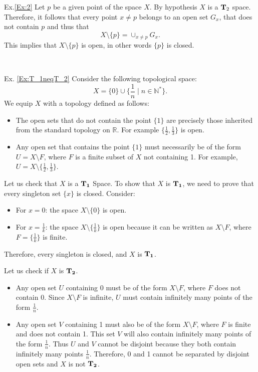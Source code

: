 Ex.\ref{Ex:2}
Let $p$ be a given point of the space $X$. By hypothesis $X$ is a ${\bf T}_2$ space. 
Therefore, it follows that every point $x\neq p$ belongs to an open set $G_x$, that does not contain $p$ and thus that \[X\setminus\{p\}=\cup_{x\neq p}G_x.\] This implies that $X\setminus\{p\}$ is open, in other words $\{p\}$ is closed.

\, 

Ex. \ref{Ex:T_1neqT_2}  Consider the following topological space:
\[
X = \bigg\{ 0 \bigg\} \cup \bigg\{ \frac{1}{n} \;\bigg|\; n \in \mathbb{N}^* \bigg\}.
\]
We equip $X$ with a topology defined as follows:
\begin{itemize}
    \item The open sets that do not contain the point $\{1\}$ are precisely those inherited from the standard topology on $\mathbb{R}$. For example $\{\frac{1}{2},\frac{1}{3}\}$ is open.
    \item Any open set that contains the point $\{1\}$ must necessarily be of the form $U=X\setminus F$, where $F$ is a finite subset of $X$ not containing 1. For example, $U=X\setminus \{\frac{1}{2},\frac{1}{3}\}$.
\end{itemize}

Let us check that $X$ is a ${\bf T_1}$ Space. To show that $X$ is ${\bf T_1}$, we need to prove that every singleton set $\{x\}$ is closed. 
Consider:
\begin{itemize}
    \item For $x=0$: the space $X\setminus\{0\}$ is open. 
    \item For $x=\frac{1}{k}$: the space $X\setminus\{\frac{1}{k}\}$ is open because it can be written as $X\setminus F$, where $F=\{\frac{1}{k}\}$ is finite. 
\end{itemize}
Therefore, every singleton is closed, and $X$ is ${\bf T_1}$.

Let us check if $X$ is ${\bf T_2}$. 
\begin{itemize}
    \item Any open set $U$ containing 0 must be of the form $X\setminus F$, where $F$ does not contain 0. Since $X\setminus F$ is infinite, 
$U$ must contain infinitely many points of the form $\frac{1}{n}$.
\item Any open set $V$ containing 1 must also be of the form $X\setminus F$, where $F$ is finite and does not contain 1. This set $V$ will also contain infinitely many points of the form $\frac{1}{n}$. Thus $U$ and $V$ cannot be disjoint because they both contain infinitely many points $\frac{1}{n}$. Therefore, 0 and 1 cannot be separated by disjoint open sets and $X$ is not ${\bf T_2}$.
\end{itemize}

